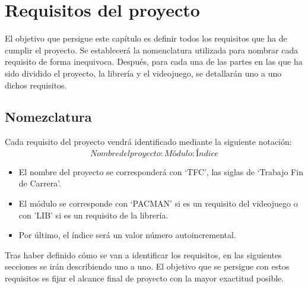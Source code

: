 \chapter{Requisitos del proyecto}

El objetivo que persigue este capítulo es definir todos los requisitos que ha de cumplir el proyecto. Se establecerá la nomenclatura utilizada para nombrar  cada requisito de forma inequivoca. Después, para cada una de las partes en las que ha sido dividido el proyecto, la librería y el videojuego, se detallarán uno a uno dichos requisitos.

\newpage


\section{Nomezclatura}

Cada requisito del proyecto vendrá identificado mediante la siguiente notación:
$$Nombre del proyecto : Módulo : Índice$$
\begin{itemize}
\item El nombre del proyecto se corresponderá con `TFC', las siglas de `Trabajo Fin de Carrera'.
\item El módulo se corresponde con `PACMAN' si es un requisito del videojuego o con 'LIB' si es un requisito de la librería.
\item Por último, el índice será un valor número autoincremental.
\end{itemize}

Tras haber definido cómo se van a identificar los requisitos, en las siguientes secciones  se irán describiendo uno a uno. El objetivo que se persigue con estos requisitos es fijar el alcance final de proyecto con la mayor exactitud posible.

